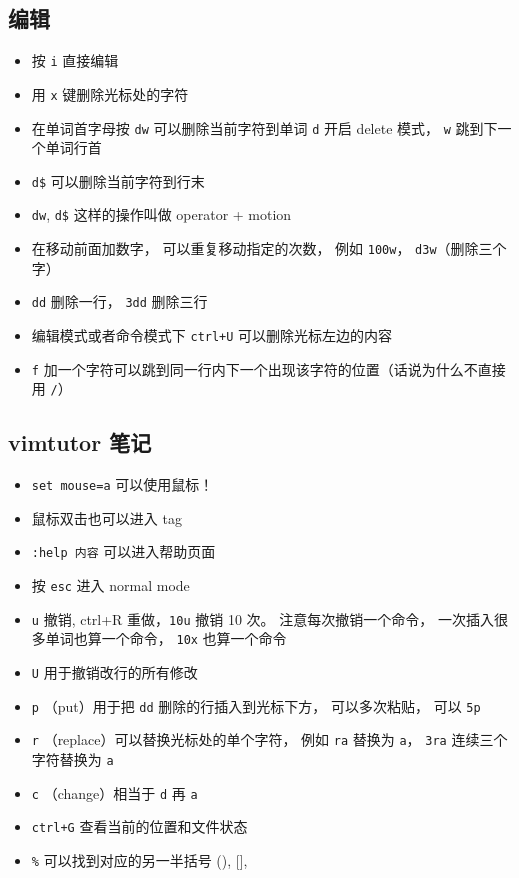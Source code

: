 \subsection{编辑}
\begin{itemize}
\item 按 \verb`i` 直接编辑
\item 用 \verb`x` 键删除光标处的字符
\item 在单词首字母按 \verb`dw` 可以删除当前字符到单词 \verb`d` 开启 delete 模式， \verb`w` 跳到下一个单词行首
\item \verb`d$` 可以删除当前字符到行末 
\item \verb`dw`, \verb`d$` 这样的操作叫做 operator + motion
\item 在移动前面加数字， 可以重复移动指定的次数， 例如 \verb`100w`， \verb`d3w`（删除三个字）
\item \verb`dd` 删除一行， \verb`3dd` 删除三行
\item 编辑模式或者命令模式下 \verb`ctrl+U` 可以删除光标左边的内容
\item \verb`f` 加一个字符可以跳到同一行内下一个出现该字符的位置（话说为什么不直接用 \verb`/`）
\end{itemize}

\subsection{vimtutor 笔记}
\begin{itemize}
\item \verb`set mouse=a` 可以使用鼠标！
\item 鼠标双击也可以进入 tag
\item \verb`:help 内容` 可以进入帮助页面
\item 按 \verb`esc` 进入 normal mode
\item \verb`u` 撤销, ctrl+R 重做，\verb`10u` 撤销 10 次。 注意每次撤销一个命令， 一次插入很多单词也算一个命令， \verb`10x` 也算一个命令
\item \verb`U` 用于撤销改行的所有修改
\item \verb`p` （put）用于把 \verb`dd` 删除的行插入到光标下方， 可以多次粘贴， 可以 \verb`5p`
\item \verb`r` （replace）可以替换光标处的单个字符， 例如 \verb`ra` 替换为 \verb`a`， \verb`3ra` 连续三个字符替换为 \verb`a`
\item \verb`c` （change）相当于 \verb`d` 再 \verb`a`
\item \verb`ctrl+G` 查看当前的位置和文件状态
\item \verb`%` 可以找到对应的另一半括号 (), [], {}
\end{itemize}

